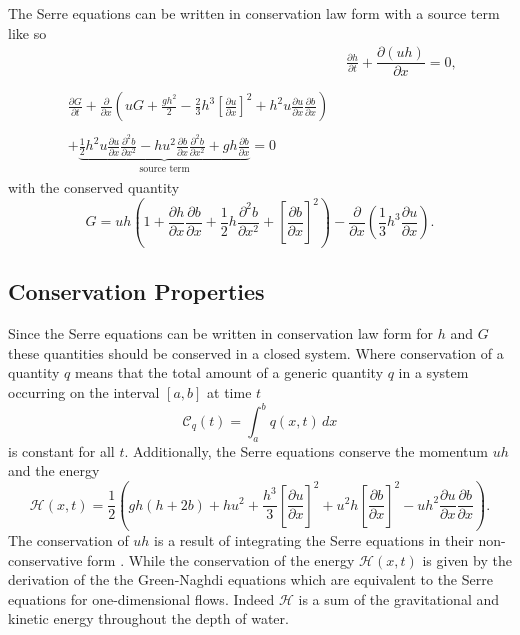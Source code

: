 \documentclass[times]{elsarticle}
\begin{document}
The Serre equations can be written in conservation law form with a source term \cite{Zoppou-etal-2017} like so
\begin{subequations}
	\label{eqn:FullSerreCon}
	\begin{align}
	& \frac{\partial h}{\partial t} + \dfrac{\partial (uh)}{\partial x} = 0 ,\label{eqn:FullSerreConMass}  \\ \nonumber \\
	\begin{split}
	\label{eqn:Serreconsconmom}
	\frac{\partial G}{\partial t}  + \frac{\partial}{\partial x} \left( {u} G + \frac{gh^2}{2} - \frac{2}{3}h^3 \left[\frac{\partial {u}}{\partial x}\right]^2 + h^2 {u}\frac{\partial {u}}{\partial x}\frac{\partial b}{\partial x} \right) \\ \\ +  \underbrace{\frac{1}{2}h^2 {u} \frac{\partial {u}}{\partial x} \frac{\partial^2 b}{\partial x^2}  - h {u}^2\frac{\partial b}{\partial x}\frac{\partial^2 b}{\partial x^2} + gh\frac{\partial b}{\partial x} } _{\text{source term}} = 0
	\end{split}
	\end{align}
\end{subequations}
with the conserved quantity
\begin{equation}
\label{defn:SerreEqnConservedQuantity1}
G =  {u}h \left(1 + \frac{\partial h}{\partial x}\frac{\partial b}{\partial x} + \frac{1}{2}h\frac{\partial^2 b}{\partial x^2} + \left[\frac{\partial b}{\partial x}\right]^2 \right) - \frac{\partial}{\partial x}\left(\frac{1}{3}h^3  \frac{\partial {u}}{\partial x}\right).
\end{equation}

\subsection{Conservation Properties}
Since the Serre equations can be written in conservation law form for $h$ and $G$ these quantities should be conserved in a closed system. Where conservation of a quantity $q$ means that the total amount of a generic quantity $q$ in a system occurring on the interval $[a,b]$ at time $t$
\begin{equation*}
\mathcal{C}_q(t) = \int_{a}^{b} q(x,t)\, dx
\end{equation*}
is constant for all $t$. Additionally, the Serre equations conserve the momentum $uh$ and the energy
\begin{equation*}
\mathcal{H}(x,t) = \frac{1}{2} \left( gh\left(h + 2b\right) + hu^2  + \frac{h^3}{3} \left[\frac{\partial u}{\partial x}\right]^2 + u^2h\left[\frac{\partial b}{\partial x}\right]^2 - uh^2 \frac{\partial u}{\partial x} \frac{\partial b}{\partial x}  \right).
\label{eqn:Hamildef}
\end{equation*}
The conservation of $uh$ is a result of integrating the Serre equations in their non-conservative form \cite{Zoppou-etal-2017}. While the conservation of the energy $\mathcal{H}(x,t)$ is given by the derivation of the the Green-Naghdi equations \cite{Green-Naghdi-1976-237} which are equivalent to the Serre equations for one-dimensional flows. Indeed $\mathcal{H}$ is a sum of the gravitational and kinetic energy throughout the depth of water. 
\end{document}
